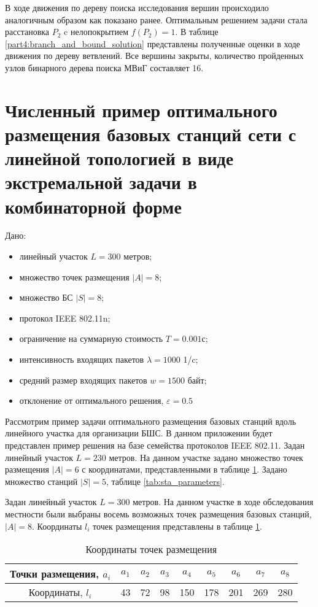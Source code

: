 В ходе движения по дереву поиска исследования вершин происходило аналогичным образом как показано ранее. Оптимальным решением задачи стала расстановка $P_2$ c нелопокрытием $f(P_2) = 1$. В таблице \cref{part4:branch_and_bound_solution} представлены полученные оценки в ходе движения по дереву ветвлений.  Все вершины закрыты, количество пройденных узлов бинарного дерева поиска МВиГ составляет 16.

\section{Численный пример оптимального размещения базовых станций сети с линейной топологией в виде экстремальной задачи в комбинаторной форме}\label{part4:bnb_solution}



Дано:
\begin{itemize}
  \item линейный участок $L =300$ метров;
  \item множество точек размещения $|A| =8$;
  \item множество БС $|S| =8$;
  \item протокол IEEE 802.11n;
  \item ограничение на суммарную стоимость $T =0.001$с;
  \item интенсивность входящих пакетов $\lambda = 1000$ 1/c;
  \item средний размер входящих пакетов $w = 1500$ байт;
  \item отклонение от оптимального решения, $\varepsilon=0.5$%
\end{itemize}

Рассмотрим пример задачи оптимального размещения базовых станций вдоль линейного участка для организации БШС. В данном приложении будет представлен пример решения на базе семейства протоколов IEEE 802.11. Задан линейный участок $L =230$ метров. На данном участке задано множество точек размещения  $|A| =6$ с координатами, представленными в таблице \cref{tab:placement_point}. Задано множество станций $|S| =5$, таблице \cref{tab:sta_parameters}. 




Задан линейный участок $L =300$ метров. На данном участке в ходе обследования местности были выбраны восемь возможных точек размещения базовых станций, $|A| =8$. Координаты $l_i$ точек размещения представлены в таблице \cref{tab:placement_point}.

\begin{table}[h!]\centering
  \begin{tabular}{|c||c|c|c|c|c|c|c|c|}\hline
      
      Точки размещения, $a_i$ &	$a_1$&	$a_2$&	$a_3$&	$a_4$&	$a_5$&	$a_6$&	$a_7$& $a_8$ \\
      \hline
      Координаты, $l_i$ &	43&	72&	98&	150&	178&	201&	269&	280\\
      \hline

\end{tabular}\caption{Координаты точек размещения}\label{tab:placement_point}
\end{table}

